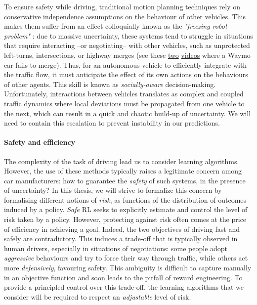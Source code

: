 To ensure safety while driving, traditional motion planning techniques rely on conservative independence assumptions on the behaviour of other vehicles. This makes them suffer from an effect colloquially known as the \emph{"freezing robot problem"} \citep{Trautman2010}: due to massive uncertainty, these systems tend to struggle in situations that require interacting --or negotiating-- with other vehicles, such as unprotected left-turns, intersections, or highway merges (see \eg these \href{https://www.youtube.com/watch?v=HjtiiGCe1pE}{two} \href{https://twitter.com/nitguptaa/status/990683818825736192}{videos} where a Waymo car fails to merge). 
Thus, for an autonomous vehicle to efficiently integrate with the traffic flow, it must anticipate the effect of its own actions on the behaviours of other agents. This skill is known as \emph{socially-aware} decision-making. Unfortunately, interactions between vehicles translates as complex and coupled traffic dynamics where local deviations must be propagated from one vehicle to the next, which can result in a quick and chaotic build-up of uncertainty. We will need to contain this escalation to prevent instability in our predictions.

\paragraph{Safety and efficiency}

The complexity of the task of driving lead us to consider learning algorithms. However, the use of these methods typically raises a legitimate concern among car manufacturers: how to guarantee the \emph{safety} of such systems, in the presence of uncertainty? In this thesis, we will strive to formalize this concern by formalising different notions of \emph{risk}, as functions of the distribution of outcomes induced by a policy. \emph{Safe} \acl*{RL} seeks to explicitly estimate and control the level of risk taken by a policy.
However, protecting against risk often comes at the price of efficiency in achieving a goal. Indeed, the two objectives of driving fast and safely are contradictory. This induces a trade-off that is typically observed in human drivers, especially in situations of negotiations: some people adopt \emph{aggressive} behaviours and try to force their way through traffic, while others act more \emph{defensively}, favouring safety. This ambiguity is difficult to capture manually in an objective function and soon leads to the pitfall of reward engineering. To provide a principled control over this trade-off, the learning algorithms that we consider will be required to respect an \emph{adjustable} level of risk.

